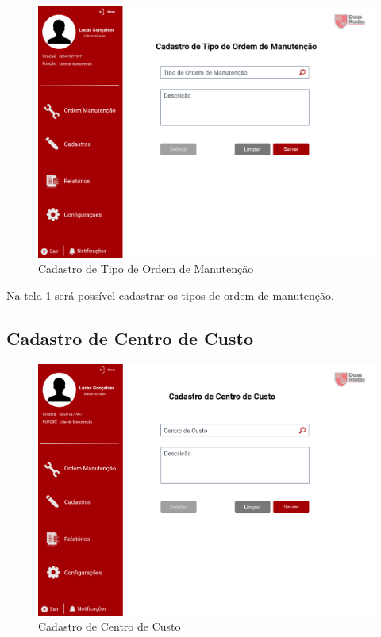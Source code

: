 \begin{figure}[htb]
	\caption{\label{web_cad-tipo-om}Cadastro de Tipo de Ordem de Manutenção}
	\begin{center}
		\includegraphics[scale=0.55]{./Figuras/web/cad-tipo-om.png}
	\end{center}
\end{figure}

Na tela \ref{web_cad-tipo-om} será possível cadastrar os tipos de ordem de manutenção.

\newpage
\subsection{Cadastro de Centro de Custo}

\begin{figure}[htb]
	\caption{\label{web_cad-centro-custo}Cadastro de Centro de Custo}
	\begin{center}
		\includegraphics[scale=0.55]{./Figuras/web/cad-centro-custo.png}
	\end{center}
\end{figure}

